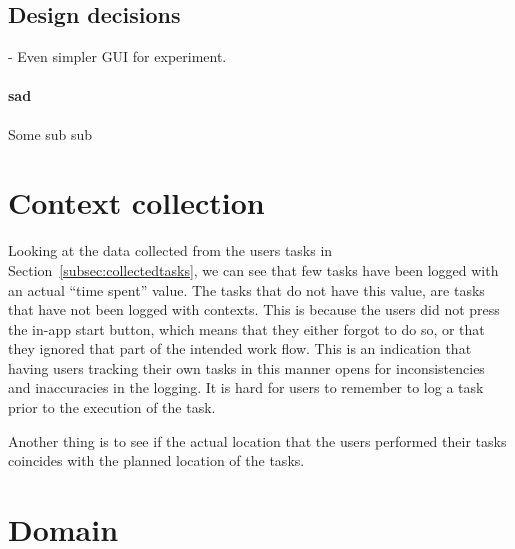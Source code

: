 \subsection{Design decisions}


- Even simpler GUI for experiment.

\paragraph{sad}
Some sub sub 


\section{Context collection}

Looking at the data collected from the users tasks in Section~\ref{subsec:collectedtasks}, we can see that few tasks have been logged with an actual ``time spent'' value. The tasks that do not have this value, are tasks that have not been logged with contexts. This is because the users did not press the in-app start button, which means that they either forgot to do so, or that they ignored that part of the intended work flow. This is an indication that having users tracking their own tasks in this manner opens for inconsistencies and inaccuracies in the logging. It is hard for users to remember to log a task prior to the execution of the task.


Another thing is to see if the actual location that the users performed their tasks coincides with the planned location of the tasks.


\section{Domain}

